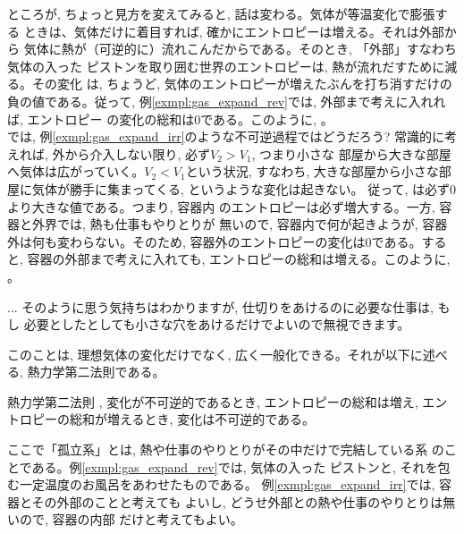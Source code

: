ところが, ちょっと見方を変えてみると, 話は変わる。気体が等温変化で膨張する
ときは、気体だけに着目すれば, 確かにエントロピーは増える。それは外部から
気体に熱が（可逆的に）流れこんだからである。そのとき, 「外部」すなわち気体の入った
ピストンを取り囲む世界のエントロピーは, 熱が流れだすために減る。その変化
は, ちょうど, 気体のエントロピーが増えたぶんを打ち消すだけの負の値である。従って, 
例\ref{exmpl:gas_expand_rev}では, 外部まで考えに入れれば, エントロピー
の変化の総和は0である。このように, 。\\

では, 例\ref{exmpl:gas_expand_irr}のような不可逆過程ではどうだろう? 
常識的に考えれば, 外から介入しない限り, 必ず$V_2>V_1$, つまり小さな
部屋から大きな部屋へ気体は広がっていく。$V_2<V_1$という状況, すなわち, 
大きな部屋から小さな部屋に気体が勝手に集まってくる, というような変化は起きない。
従って, は必ず0より大きな値である。つまり, 容器内
のエントロピーは必ず増大する。一方, 容器と外界では, 熱も仕事もやりとりが
無いので, 容器内で何が起きようが, 容器外は何も変わらない。そのため, 
容器外のエントロピーの変化は0である。すると, 容器の外部まで考えに入れても, 
エントロピーの総和は増える。このように, 。\\

\begin{faq}{\small{}
 ... そのように思う気持ちはわかりますが, 仕切りをあけるのに必要な仕事は, もし
必要としたとしても小さな穴をあけるだけでよいので無視できます。}\end{faq}\mv

このことは, 理想気体の変化だけでなく, 広く一般化できる。それが以下に述べる, 
熱力学第二法則である。

\begin{itembox}{熱力学第二法則}
, 変化が不可逆的であるとき, エントロピーの総和は増え, 
エントロピーの総和が増えるとき, 変化は不可逆的である。
\end{itembox}

ここで「孤立系」とは, 熱や仕事のやりとりがその中だけで完結している系
のことである。例\ref{exmpl:gas_expand_rev}では, 気体の入った
ピストンと, それを包む一定温度のお風呂をあわせたものである。
例\ref{exmpl:gas_expand_irr}では, 容器とその外部のことと考えても
よいし, どうせ外部との熱や仕事のやりとりは無いので, 容器の内部
だけと考えてもよい。

